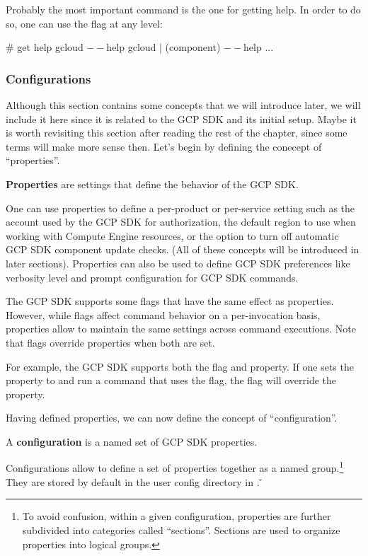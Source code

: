 Probably the most important command is the one for getting help. In order to do so, one can use the flag 
at any  level:

\begin{bash}
# get help
gcloud $--$help
gcloud | (component) $--$help
...
\end{bash}

\subsubsection{Configurations}

Although this section contains some concepts that we will introduce later, we will include it here since it is related
to the GCP SDK and its initial setup. Maybe it is worth revisiting this section after reading the rest of the chapter,
since some terms will make more sense then. \v

Let's begin by defining the conecept of ``properties''.

\bd[Properties]
\textbf{Properties} are settings that define the behavior of the GCP SDK\@.
\ed

\be
One can use properties to define a per-product or per-service setting such as the account used by the GCP SDK for
authorization, the default region to use when working with Compute Engine resources, or the option to turn off
automatic GCP SDK component update checks. (All of these concepts will be introduced in later sections). Properties
can also be used to define GCP SDK preferences like verbosity level and prompt configuration for GCP SDK commands.
\ee

The GCP SDK supports some flags that have the same effect as properties. However, while flags affect command behavior
on a per-invocation basis, properties allow to maintain the same settings across command executions. Note that flags
override properties when both are set.

\be
For example, the GCP SDK supports both the  flag and  property. If one sets the
 property to  and run a command that uses the  flag, the flag will
override the property.
\ee

Having defined properties, we can now define the concept of ``configuration''.

\bd[Configuration]
A \textbf{configuration} is a named set of GCP SDK properties.
\ed

Configurations allow to define a set of properties together as a named group.\footnote{To avoid confusion, within a
given configuration, properties are further subdivided into categories called ``sections''. Sections are used to
organize properties into logical groups.} They are stored by default in the user config directory in
. \v

